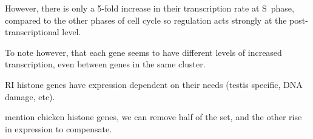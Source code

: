     However, there is only a 5-fold increase in their transcription rate at S~phase, compared to the other phases
    of cell cycle so regulation acts strongly at the post-transcriptional level\addref.

    To note however, that each gene seems to have different levels of increased transcription, even between genes in the
    same cluster.

    RI histone genes have expression dependent on their needs (testis specific, DNA damage, etc).

    mention chicken histone genes, we can remove half of the set, and the other rise in expression to compensate.



